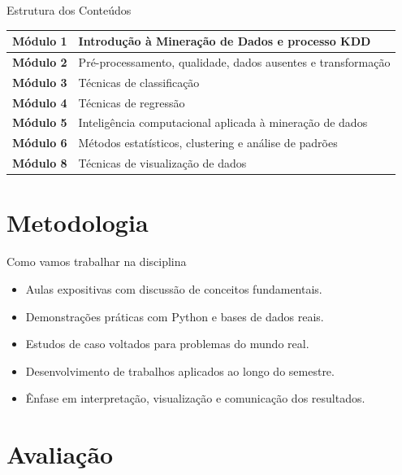 \documentclass[aspectratio=169]{beamer}
\begin{document}
\begin{frame}{Estrutura dos Conteúdos}
    \small
    \begin{tabular}{>{\bfseries}p{2.3cm} p{7.8cm}}
        \hline
        Módulo 1 & Introdução à Mineração de Dados e processo KDD \\
        \hline
        Módulo 2 & Pré-processamento, qualidade, dados ausentes e transformação \\
        \hline
        Módulo 3 & Técnicas de classificação \\
        \hline
        Módulo 4 & Técnicas de regressão \\
        \hline
        Módulo 5 & Inteligência computacional aplicada à mineração de dados \\
        \hline
        Módulo 6 & Métodos estatísticos, clustering e análise de padrões \\
        \hline
        Módulo 8 & Técnicas de visualização de dados \\
        \hline
    \end{tabular}
\end{frame}

\section{Metodologia}

\begin{frame}{Como vamos trabalhar na disciplina}
    \begin{itemize}
        \item Aulas expositivas com discussão de conceitos fundamentais.
        \item Demonstrações práticas com Python e bases de dados reais.
        \item Estudos de caso voltados para problemas do mundo real.
        \item Desenvolvimento de trabalhos aplicados ao longo do semestre.
        \item Ênfase em interpretação, visualização e comunicação dos resultados.
    \end{itemize}
\end{frame}

\section{Avaliação}
\end{document}
